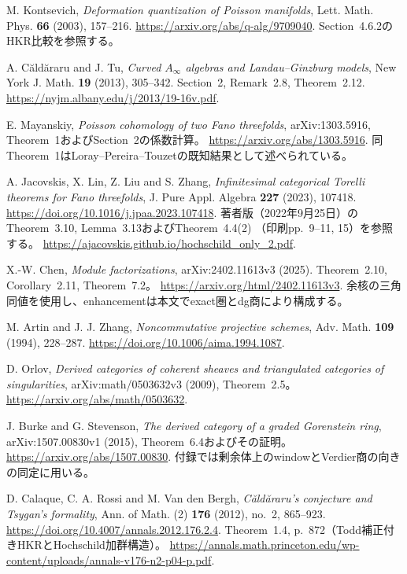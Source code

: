 M. Kontsevich, \emph{Deformation quantization of Poisson manifolds},
Lett. Math. Phys. \textbf{66} (2003), 157--216.
\url{https://arxiv.org/abs/q-alg/9709040}.
Section~4.6.2のHKR比較を参照する。

A. C\u{a}ld\u{a}raru and J. Tu,
\emph{Curved $A_\infty$ algebras and Landau--Ginzburg models},
New York J. Math. \textbf{19} (2013), 305--342.
Section~2, Remark~2.8, Theorem~2.12.
\url{https://nyjm.albany.edu/j/2013/19-16v.pdf}.

E. Mayanskiy, \emph{Poisson cohomology of two Fano threefolds},
arXiv:1303.5916, Theorem~1およびSection~2の係数計算。
\url{https://arxiv.org/abs/1303.5916}.
同Theorem~1はLoray--Pereira--Touzetの既知結果として述べられている。

A. Jacovskis, X. Lin, Z. Liu and S. Zhang,
\emph{Infinitesimal categorical Torelli theorems for Fano threefolds},
J. Pure Appl. Algebra \textbf{227} (2023), 107418.
\url{https://doi.org/10.1016/j.jpaa.2023.107418}.
著者版（2022年9月25日）のTheorem~3.10, Lemma~3.13およびTheorem~4.4(2)
（印刷pp.~9--11, 15）を参照する。
\url{https://ajacovskis.github.io/hochschild_only_2.pdf}.

X.-W. Chen, \emph{Module factorizations}, arXiv:2402.11613v3 (2025).
Theorem~2.10, Corollary~2.11, Theorem~7.2。
\url{https://arxiv.org/html/2402.11613v3}.
余核の三角同値を使用し、enhancementは本文でexact圏とdg商により構成する。

M. Artin and J. J. Zhang, \emph{Noncommutative projective schemes},
Adv. Math. \textbf{109} (1994), 228--287.
\url{https://doi.org/10.1006/aima.1994.1087}.

D. Orlov, \emph{Derived categories of coherent sheaves and triangulated categories of singularities},
arXiv:math/0503632v3 (2009), Theorem~2.5。
\url{https://arxiv.org/abs/math/0503632}.

J. Burke and G. Stevenson, \emph{The derived category of a graded Gorenstein ring},
arXiv:1507.00830v1 (2015), Theorem~6.4およびその証明。
\url{https://arxiv.org/abs/1507.00830}.
付録では剰余体上のwindowとVerdier商の向きの同定に用いる。

D. Calaque, C. A. Rossi and M. Van den Bergh,
\emph{C\u{a}ld\u{a}raru's conjecture and Tsygan's formality},
Ann. of Math. (2) \textbf{176} (2012), no.~2, 865--923.
\url{https://doi.org/10.4007/annals.2012.176.2.4}.
Theorem~1.4, p.~872（Todd補正付きHKRとHochschild加群構造）。
\url{https://annals.math.princeton.edu/wp-content/uploads/annals-v176-n2-p04-p.pdf}.
